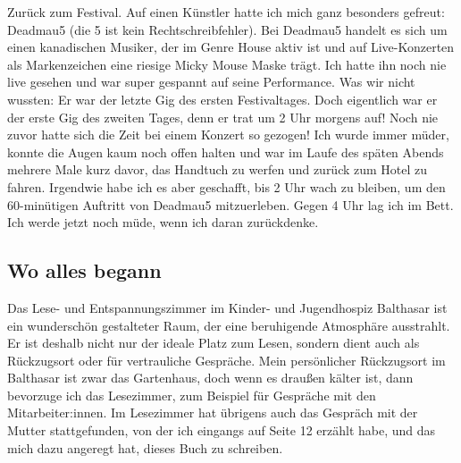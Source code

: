 \documentclass[fontsize=14pt,a4paper,headinclude,DIV=calc,automark]{scrbook}
\begin{document}
Zurück zum Festival. Auf einen Künstler hatte ich mich ganz besonders gefreut: Deadmau5 (die 5 ist kein Rechtschreibfehler). Bei Deadmau5 handelt es sich um einen kanadischen Musiker, der im Genre House aktiv ist und auf Live-Konzerten als Markenzeichen eine riesige Micky Mouse Maske trägt. Ich hatte ihn noch nie live gesehen und war super gespannt auf seine Performance. Was wir nicht wussten: Er war der letzte Gig des ersten Festivaltages. Doch eigentlich war er der erste Gig des zweiten Tages, denn er trat um 2 Uhr morgens auf! Noch nie zuvor hatte sich die Zeit bei einem Konzert so gezogen! Ich wurde immer müder, konnte die Augen kaum noch offen halten und war im Laufe des späten Abends mehrere Male kurz davor, das Handtuch zu werfen und zurück zum Hotel zu fahren. Irgendwie habe ich es aber geschafft, bis 2 Uhr wach zu bleiben, um den 60-minütigen Auftritt von Deadmau5 mitzuerleben. Gegen 4 Uhr lag ich im Bett. Ich werde jetzt noch müde, wenn ich daran zurückdenke.

\subsection{Wo alles begann}

Das Lese- und Entspannungszimmer im Kinder- und Jugendhospiz Balthasar ist ein wunderschön gestalteter Raum, der eine beruhigende Atmosphäre ausstrahlt. Er ist deshalb nicht nur der ideale Platz zum Lesen, sondern dient auch als Rückzugsort oder für vertrauliche Gespräche. Mein persönlicher Rückzugsort im Balthasar ist zwar das Gartenhaus, doch wenn es draußen kälter ist, dann bevorzuge ich das Lesezimmer, zum Beispiel für Gespräche mit den Mitarbeiter:innen. Im Lesezimmer hat übrigens auch das Gespräch mit der Mutter stattgefunden, von der ich eingangs auf Seite 12 erzählt habe, und das mich dazu angeregt hat, dieses Buch zu schreiben.
\end{document}
